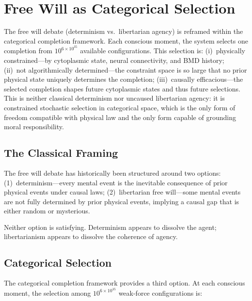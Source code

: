 \chapter{Free Will as Categorical Selection}
\label{ch:free_will}

\begin{chapterabstract}
The free will debate (determinism vs.\ libertarian agency) is reframed within the categorical completion framework. Each conscious moment, the system selects one completion from $10^{6 \times 10^{35}}$ available configurations. This selection is: (i)~physically constrained---by cytoplasmic state, neural connectivity, and BMD history; (ii)~not algorithmically determined---the constraint space is so large that no prior physical state uniquely determines the completion; (iii)~causally efficacious---the selected completion shapes future cytoplasmic states and thus future selections. This is neither classical determinism nor uncaused libertarian agency: it is constrained stochastic selection in categorical space, which is the only form of freedom compatible with physical law and the only form capable of grounding moral responsibility.
\end{chapterabstract}

\section{The Classical Framing}

The free will debate has historically been structured around two options: (1)~determinism---every mental event is the inevitable consequence of prior physical events under causal laws; (2)~libertarian free will---some mental events are not fully determined by prior physical events, implying a causal gap that is either random or mysterious.

Neither option is satisfying. Determinism appears to dissolve the agent; libertarianism appears to dissolve the coherence of agency.

\section{Categorical Selection}

The categorical completion framework provides a third option. At each conscious moment, the selection among $10^{6 \times 10^{35}}$ weak-force configurations is:

